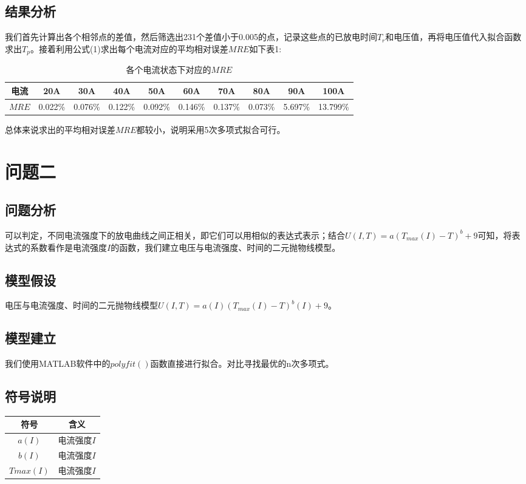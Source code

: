 \documentclass[a4paper]{article}
\begin{document}
\subsection{结果分析}
我们首先计算出各个相邻点的差值，然后筛选出231个差值小于0.005的点，记录这些点的已放电时间$T_r$和电压值，再将电压值代入拟合函数求出$T_p$。接着利用公式(1)求出每个电流对应的平均相对误差$MRE$如下表1:
\begin{table}[htbp]
    \centering
    \begin{center}
        \begin{tabular}{|c|c|c|c|c|c|c|c|c|c|}
            \hline
            电流    & 20A     & 30A     & 40A     & 50A     & 60A     & 70A     & 80A     & 90A     & 100A     \\ \hline
            $MRE$ & 0.022\% & 0.076\% & 0.122\% & 0.092\% & 0.146\% & 0.137\% & 0.073\% & 5.697\% & 13.799\% \\ \hline
        \end{tabular}
        \caption{各个电流状态下对应的$MRE$}
        \label{tab:my-table}
    \end{center}
\end{table}

总体来说求出的平均相对误差$MRE$都较小，说明采用5次多项式拟合可行。

\section{问题二}
\subsection{问题分析}
可以判定，不同电流强度下的放电曲线之间正相关，即它们可以用相似的表达式表示；结合$U(I,T)=a(T_{max}(I)-T)^b+9$可知，将表达式的系数看作是电流强度$I$的函数，我们建立电压与电流强度、时间的二元抛物线模型。
\subsection{模型假设}
电压与电流强度、时间的二元抛物线模型$U(I,T)=a(I)(T_{max}(I)-T)^b(I)+9$。
\subsection{模型建立}
我们使用MATLAB软件中的$polyfit()$函数直接进行拟合。对比寻找最优的n次多项式。
\subsection{符号说明}
\begin{table}[htbp]
    \begin{center}
        \setlength\tabcolsep{40pt}
        \renewcommand{\arraystretch}{1.4}
        \begin{tabular}{c c}
            \hline
            符号        & 含义      \\ \hline
            $a(I)$    & 电流强度$I$ \\
            $b(I)$    & 电流强度$I$ \\
            $Tmax(I)$ & 电流强度$I$ \\
            \hline
        \end{tabular}
    \end{center}
\end{table}
\end{document}
